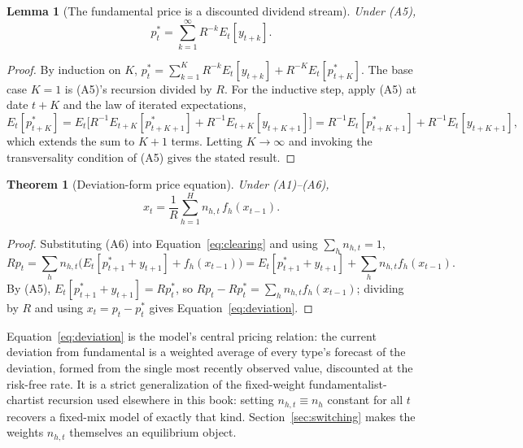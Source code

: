 \documentclass[11pt]{article}
\newtheorem{theorem}{Theorem}
\newtheorem{lemma}{Lemma}
\theoremstyle{remark}
\theoremstyle{definition}
\begin{document}
\begin{lemma}[The fundamental price is a discounted dividend stream]
\label{lem:fundamental}
Under (A5),
\begin{equation*}
p_t^* = \sum_{k=1}^{\infty} R^{-k}E_t[y_{t+k}].
\end{equation*}
\end{lemma}
\begin{proof}
By induction on $K$, $p_t^*=\sum_{k=1}^{K}R^{-k}E_t[y_{t+k}]+R^{-K}E_t[p_{t+K}^*]$. The base case $K=1$ is (A5)'s recursion divided by $R$. For the inductive step, apply (A5) at date $t+K$ and the law of iterated expectations,
\begin{equation*}
E_t[p_{t+K}^*]=E_t\big[R^{-1}E_{t+K}[p_{t+K+1}^*]+R^{-1}E_{t+K}[y_{t+K+1}]\big]
=R^{-1}E_t[p^*_{t+K+1}]+R^{-1}E_t[y_{t+K+1}],
\end{equation*}
which extends the sum to $K+1$ terms. Letting $K\to\infty$ and invoking the transversality condition of (A5) gives the stated result.
\end{proof}

\begin{theorem}[Deviation-form price equation]
\label{thm:deviation}
Under (A1)--(A6),
\begin{equation}
x_t = \frac{1}{R}\sum_{h=1}^{H} n_{h,t}\,f_h(x_{t-1}).
\label{eq:deviation}
\end{equation}
\end{theorem}
\begin{proof}
Substituting (A6) into Equation~\eqref{eq:clearing} and using $\sum_h n_{h,t}=1$,
\begin{equation*}
Rp_t = \sum_h n_{h,t}\Big(E_t[p_{t+1}^*+y_{t+1}]+f_h(x_{t-1})\Big) = E_t[p_{t+1}^*+y_{t+1}] + \sum_h n_{h,t}f_h(x_{t-1}).
\end{equation*}
By (A5), $E_t[p_{t+1}^*+y_{t+1}]=Rp_t^*$, so $Rp_t-Rp_t^* = \sum_h n_{h,t}f_h(x_{t-1})$; dividing by $R$ and using $x_t=p_t-p_t^*$ gives Equation~\eqref{eq:deviation}.
\end{proof}

Equation~\eqref{eq:deviation} is the model's central pricing relation: the current deviation from fundamental is a weighted average of every type's forecast of the deviation, formed from the single most recently observed value, discounted at the risk-free rate. It is a strict generalization of the fixed-weight fundamentalist-chartist recursion used elsewhere in this book: setting $n_{h,t}\equiv n_h$ constant for all $t$ recovers a fixed-mix model of exactly that kind. Section~\ref{sec:switching} makes the weights $n_{h,t}$ themselves an equilibrium object.
\end{document}
